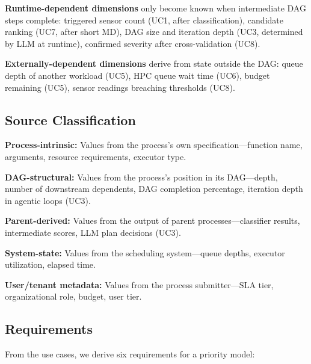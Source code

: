 \documentclass[conference]{IEEEtran}
\begin{document}
\textbf{Runtime-dependent dimensions} only become known when intermediate DAG steps complete: triggered sensor count (UC1, after classification), candidate ranking (UC7, after short MD), DAG size and iteration depth (UC3, determined by LLM at runtime), confirmed severity after cross-validation (UC8).

\textbf{Externally-dependent dimensions} derive from state outside the DAG: queue depth of another workload (UC5), HPC queue wait time (UC6), budget remaining (UC5), sensor readings breaching thresholds (UC8).

\subsection{Source Classification}

\textbf{Process-intrinsic:} Values from the process's own specification---function name, arguments, resource requirements, executor type.

\textbf{DAG-structural:} Values from the process's position in its DAG---depth, number of downstream dependents, DAG completion percentage, iteration depth in agentic loops (UC3).

\textbf{Parent-derived:} Values from the output of parent processes---classifier results, intermediate scores, LLM plan decisions (UC3).

\textbf{System-state:} Values from the scheduling system---queue depths, executor utilization, elapsed time.

\textbf{User/tenant metadata:} Values from the process submitter---SLA tier, organizational role, budget, user tier.

\subsection{Requirements}

From the use cases, we derive six requirements for a priority model:
\end{document}

